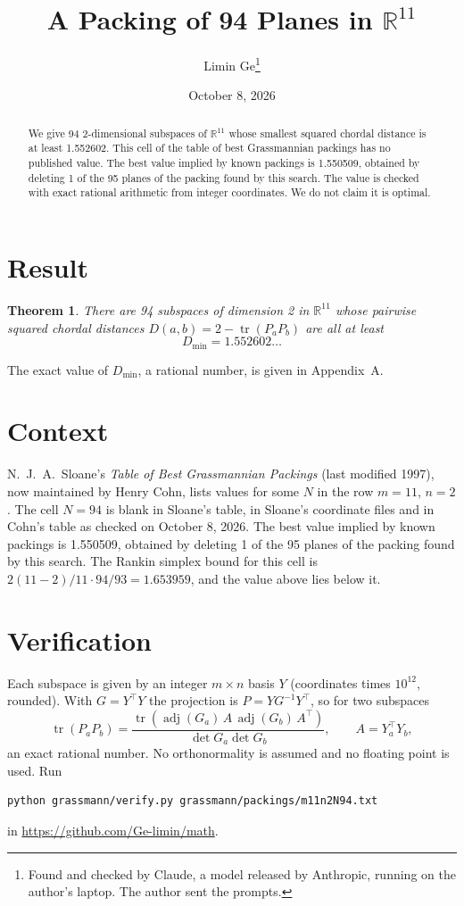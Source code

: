 \documentclass[11pt,a4paper]{article}
\title{A Packing of 94 Planes in $\mathbb{R}^{11}$}
\author{Limin Ge\thanks{Found and checked by Claude, a model released by Anthropic, running on the author's laptop. The author sent the prompts.}}
\date{October 8, 2026}
\newtheorem*{theorem}{Theorem}
\begin{document}
\maketitle
\begin{abstract}
We give 94 2-dimensional subspaces of $\mathbb{R}^{11}$ whose smallest squared chordal distance is at least 1.552602. This cell of the table of best Grassmannian packings has no published value. The best value implied by known packings is 1.550509, obtained by deleting 1 of the 95 planes of the packing found by this search. The value is checked with exact rational arithmetic from integer coordinates. We do not claim it is optimal.
\end{abstract}

\section{Result}
\begin{theorem}
There are 94 subspaces of dimension 2 in $\mathbb{R}^{11}$ whose pairwise squared chordal distances $D(a,b) = 2 - \operatorname{tr}(P_aP_b)$ are all at least
\[ D_{\min} = 1.552602\ldots \]
\end{theorem}
The exact value of $D_{\min}$, a rational number, is given in Appendix~A.


\section{Context}
N.~J.~A.~Sloane's \emph{Table of Best Grassmannian Packings} (last modified 1997), now maintained by Henry Cohn, lists values for some $N$ in the row $m=11$, $n=2$. The cell $N=94$ is blank in Sloane's table, in Sloane's coordinate files and in Cohn's table as checked on October 8, 2026. The best value implied by known packings is 1.550509, obtained by deleting 1 of the 95 planes of the packing found by this search. The Rankin simplex bound for this cell is $2(11-2)/11\cdot 94/93 = 1.653959$, and the value above lies below it.


\section{Verification}
Each subspace is given by an integer $m\times n$ basis $Y$ (coordinates times $10^{12}$, rounded). With $G=Y^\top Y$ the projection is $P=YG^{-1}Y^\top$, so for two subspaces
\[ \operatorname{tr}(P_aP_b)=\frac{\operatorname{tr}(\operatorname{adj}(G_a)\,A\,\operatorname{adj}(G_b)\,A^\top)}{\det G_a\det G_b},\qquad A=Y_a^\top Y_b, \]
an exact rational number. No orthonormality is assumed and no floating point is used. Run
\begin{verbatim}
python grassmann/verify.py grassmann/packings/m11n2N94.txt
\end{verbatim}
in \url{https://github.com/Ge-limin/math}.
\end{document}
